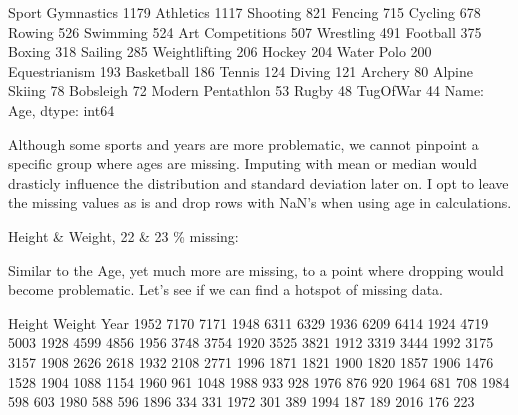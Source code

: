 \documentclass[letterpaper,10pt,english]{jupyterBook}
\begin{document}
\begin{sphinxVerbatim}[commandchars=\\\{\}]
Sport
Gymnastics           1179
Athletics            1117
Shooting              821
Fencing               715
Cycling               678
Rowing                526
Swimming              524
Art Competitions      507
Wrestling             491
Football              375
Boxing                318
Sailing               285
Weightlifting         206
Hockey                204
Water Polo            200
Equestrianism         193
Basketball            186
Tennis                124
Diving                121
Archery                80
Alpine Skiing          78
Bobsleigh              72
Modern Pentathlon      53
Rugby                  48
Tug\PYGZhy{}Of\PYGZhy{}War             44
Name: Age, dtype: int64
\end{sphinxVerbatim}

\sphinxAtStartPar
Although some sports and years are more problematic, we cannot pinpoint a specific group where ages are missing. Imputing with mean or median would drasticly influence the distribution and standard deviation later on. I opt to leave the missing values as is and drop rows with NaN’s when using age in calculations.

\sphinxAtStartPar
Height \& Weight, 22 \& 23 \% missing:

\sphinxAtStartPar
Similar to the Age, yet much more are missing, to a point where dropping would become problematic. Let’s see if we can find a hotspot of missing data.

\begin{sphinxVerbatim}[commandchars=\\\{\}]
\PYG{p}{[}\PYG{p}{[} \PYG{p}{]}\PYG{p}{]}   
\end{sphinxVerbatim}

\begin{sphinxVerbatim}[commandchars=\\\{\}]
      Height  Weight
Year                
1952    7170    7171
1948    6311    6329
1936    6209    6414
1924    4719    5003
1928    4599    4856
1956    3748    3754
1920    3525    3821
1912    3319    3444
1992    3175    3157
1908    2626    2618
1932    2108    2771
1996    1871    1821
1900    1820    1857
1906    1476    1528
1904    1088    1154
1960     961    1048
1988     933     928
1976     876     920
1964     681     708
1984     598     603
1980     588     596
1896     334     331
1972     301     389
1994     187     189
2016     176     223
\end{sphinxVerbatim}
\end{document}
